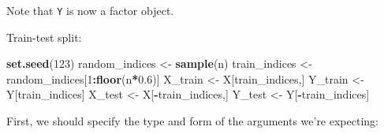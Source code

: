 \documentclass[10pt,b5paper,krantz1]{krantz}
\newenvironment{Shaded}{\begin{snugshade}}{\end{snugshade}}
\newcommand{\DataTypeTok}[1]{\textcolor[rgb]{0.27,0.27,0.27}{#1}}
\newcommand{\DecValTok}[1]{\textcolor[rgb]{0.06,0.06,0.06}{#1}}
\newcommand{\FloatTok}[1]{\textcolor[rgb]{0.06,0.06,0.06}{#1}}
\newcommand{\KeywordTok}[1]{\textcolor[rgb]{0.27,0.27,0.27}{\textbf{#1}}}
\newcommand{\NormalTok}[1]{#1}
\newcommand{\OperatorTok}[1]{\textcolor[rgb]{0.43,0.43,0.43}{\textbf{#1}}}
\newcommand{\OtherTok}[1]{\textcolor[rgb]{0.37,0.37,0.37}{#1}}
\newcommand{\StringTok}[1]{\textcolor[rgb]{0.5,0.5,0.5}{#1}}
\begin{document}
\begin{Shaded}
\end{Shaded}

Note that \texttt{Y} is now a factor object.

Train-test split:

\begin{Shaded}
\begin{Highlighting}[]
\KeywordTok{set.seed}\NormalTok{(}\DecValTok{123}\NormalTok{)}
\NormalTok{random_indices <-}\StringTok{ }\KeywordTok{sample}\NormalTok{(n)}
\NormalTok{train_indices <-}\StringTok{ }\NormalTok{random_indices[}\DecValTok{1}\OperatorTok{:}\KeywordTok{floor}\NormalTok{(n}\OperatorTok{*}\FloatTok{0.6}\NormalTok{)]}
\NormalTok{X_train <-}\StringTok{ }\NormalTok{X[train_indices,]}
\NormalTok{Y_train <-}\StringTok{ }\NormalTok{Y[train_indices]}
\NormalTok{X_test  <-}\StringTok{ }\NormalTok{X[}\OperatorTok{-}\NormalTok{train_indices,]}
\NormalTok{Y_test  <-}\StringTok{ }\NormalTok{Y[}\OperatorTok{-}\NormalTok{train_indices]}
\end{Highlighting}
\end{Shaded}

First, we should specify the type and form of the arguments
we're expecting:
\end{document}
